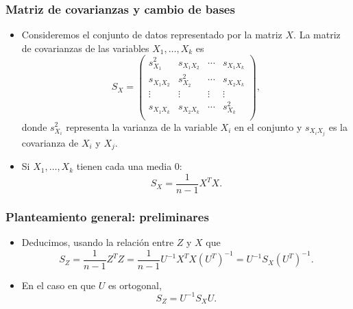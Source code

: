 \documentclass{beamer}
\begin{document}
  \begin{frame}\frametitle{      Matriz de covarianzas y cambio de bases}
    \begin{itemize}

    \item<+-> Consideremos el conjunto de datos representado por la matriz $X$. La matriz de covarianzas de las variables $X_1,\ldots,X_k$ es 
\begin{equation*}
S_X=\left(\begin{array}{llll}
s^2_{X_1}&s_{X_1X_2}&\cdots&s_{X_1X_k}\\
s_{X_1X_2}&s^2_{X_2}&\cdots&s_{X_2X_k}\\
\vdots&\vdots&\vdots&\vdots\\
s_{X_1X_k}&s_{X_2X_k}&\cdots&s^2_{X_k}\\
\end{array}\right),
\end{equation*}
donde $s^2_{X_i}$ representa la varianza de la variable $X_i$ en el conjunto y $s_{X_iX_j}$ es la covarianza de $X_i$ y $X_j$.
\item<+-> Si $X_1,\ldots,X_k$ tienen cada una media 0: 
\begin{equation*}
S_X=\frac 1 {n-1} X^TX.
\end{equation*}
    \end{itemize}
    
 \end{frame}

   \begin{frame}\frametitle{Planteamiento general: preliminares}
    \begin{itemize}
    \item<+-> Deducimos, usando la relación entre $Z$ y $X$ que 
$$S_Z=\frac 1{n-1} Z^TZ=\frac 1{n-1}U^{-1}X^TX(U^T)^{-1}=U^{-1}S_X(U^T)^{-1}.
$$
\item<+-> En el caso en que $U$ es ortogonal, 
\begin{equation*}
S_Z=U^{-1}S_XU.
\end{equation*}

    \end{itemize}
    
 \end{frame}
\end{document}
